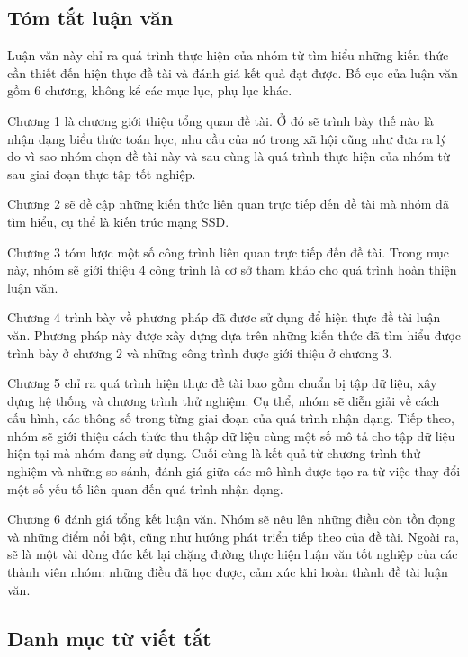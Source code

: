 \documentclass[a4paper,12pt]{article}
\begin{document}
	\newpage
	\subsection*{Tóm tắt luận văn}
	
	Luận văn  này chỉ ra quá trình thực hiện của nhóm từ tìm hiểu những kiến thức cần thiết đến hiện thực đề tài và đánh giá kết quả đạt được. Bố cục của luận văn gồm 6 chương, không kể các mục lục, phụ lục khác. 
	
	Chương 1 là chương giới thiệu tổng quan đề tài. Ở đó sẽ trình bày thế nào là nhận dạng biểu thức toán học, nhu cầu của nó trong xã hội cũng như đưa ra lý do vì sao nhóm chọn đề tài này và sau cùng là quá trình thực hiện của nhóm từ sau giai đoạn thực tập tốt nghiệp.
	
	Chương 2 sẽ đề cập những kiến thức liên quan trực tiếp đến đề tài mà nhóm đã tìm hiểu, cụ thể là kiến trúc mạng SSD.
	
	Chương 3 tóm lược một số công trình liên quan trực tiếp đến đề tài. Trong mục này, nhóm sẽ giới thiệu 4 công trình là cơ sở tham khảo cho quá trình hoàn thiện luận văn. 
	
	Chương 4 trình bày về phương pháp đã được sử dụng để hiện thực đề tài luận văn. Phương pháp này được xây dựng dựa trên những kiến thức đã tìm hiểu được trình bày ở chương 2 và những công trình được giới thiệu ở chương 3.
	
	Chương 5 chỉ ra quá trình hiện thực đề tài bao gồm chuẩn bị tập dữ liệu, xây dựng hệ thống và chương trình thử nghiệm. Cụ thể, nhóm sẽ diễn giải về cách cấu hình, các thông số trong từng giai đoạn của quá trình nhận dạng. Tiếp theo, nhóm sẽ giới thiệu cách thức thu thập dữ liệu cùng một số mô tả cho tập dữ liệu hiện tại mà nhóm đang sử dụng. Cuối cùng là kết quả từ chương trình thử nghiệm và những so sánh, đánh giá giữa các mô hình được tạo ra từ việc thay đổi một số yếu tố liên quan đến quá trình nhận dạng. 
	
	Chương 6 đánh giá tổng kết luận văn. Nhóm sẽ nêu lên những điều còn tồn đọng và những điểm nổi bật, cũng như hướng phát triển tiếp theo của đề tài. Ngoài ra, sẽ là một vài dòng đúc kết lại chặng đường thực hiện luận văn tốt nghiệp của các thành viên nhóm: những điều đã học được, cảm xúc khi hoàn thành đề tài luận văn.
	\newpage
	\setlength{\cftsecnumwidth}{3cm}
	\tableofcontents
	\newpage
	\listoffigures
	\newpage
	\listoftables
	\newpage
	
	\subsection*{Danh mục từ viết tắt}
	
\end{document}
